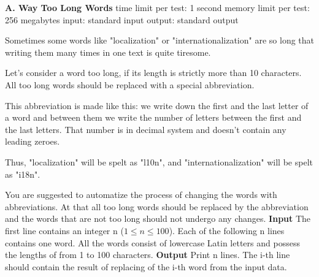 \documentclass[11pt]{article}
\begin{document}
    \begin{center}
        \textbf{A. Way Too Long Words}
        \newline
        time limit per test: 1 second
        \newline
        memory limit per test: 256 megabytes
        \newline
        input: standard input
        \newline
        output: standard output
        \newline
    \end{center}
    Sometimes some words like "localization" or "internationalization" are so long that writing them many times in one text is quite tiresome.

    Let's consider a word too long, if its length is strictly more than 10 characters.
    All too long words should be replaced with a special abbreviation.

    This abbreviation is made like this: we write down the first and the last letter of a word and between them we write the number of letters between the first and the last letters.
    That number is in decimal system and doesn't contain any leading zeroes.

    Thus, "localization" will be spelt as "l10n", and "internationalization" will be spelt as "i18n".

    You are suggested to automatize the process of changing the words with abbreviations.
    At that all too long words should be replaced by the abbreviation and the words that are not too long should not undergo any changes.
    \newline
    \newline
    \textbf{Input}
    \newline
    The first line contains an integer n ($1 \leq n \leq 100$).
    Each of the following n lines contains one word.
    All the words consist of lowercase Latin letters and possess the lengths of from 1 to 100 characters.
    \newline
    \newline
    \textbf{Output}
    \newline
    Print n lines.
    The i-th line should contain the result of replacing of the i-th word from the input data.
\end{document}
